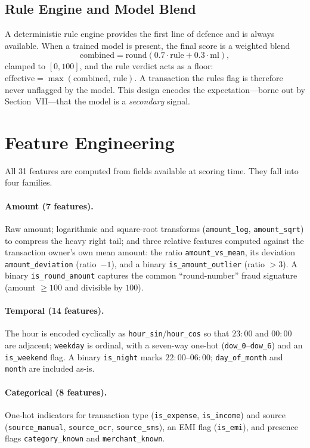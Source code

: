 \documentclass[conference]{IEEEtran}
\begin{document}
\subsection{Rule Engine and Model Blend}
A deterministic rule engine provides the first line of defence and is always
available. When a trained model is present, the final score is a weighted
blend
\begin{equation}
\text{combined} = \mathrm{round}\!\left(0.7\cdot \text{rule} +
0.3\cdot \text{ml}\right),
\end{equation}
clamped to $[0,100]$, and the rule verdict acts as a floor:
$\text{effective} = \max(\text{combined},\,\text{rule})$. A transaction the
rules flag is therefore never unflagged by the model. This design encodes the
expectation---borne out by Section~VII---that the model is a \emph{secondary}
signal.

\section{Feature Engineering}
All 31 features are computed from fields available at scoring time. They fall
into four families.

\paragraph{Amount (7 features).}
Raw amount; logarithmic and square-root transforms
(\texttt{amount\_log}, \texttt{amount\_sqrt}) to compress the heavy right
tail; and three relative features computed against the transaction owner's own
mean amount: the ratio \texttt{amount\_vs\_mean}, its deviation
\texttt{amount\_deviation} (ratio~$-1$), and a binary
\texttt{is\_amount\_outlier} (ratio $>3$). A binary
\texttt{is\_round\_amount} captures the common ``round-number'' fraud
signature (amount $\ge 100$ and divisible by $100$).

\paragraph{Temporal (14 features).}
The hour is encoded cyclically as \texttt{hour\_sin}/\texttt{hour\_cos} so
that $23{:}00$ and $00{:}00$ are adjacent; \texttt{weekday} is ordinal, with a
seven-way one-hot (\texttt{dow\_0}--\texttt{dow\_6}) and an
\texttt{is\_weekend} flag. A binary \texttt{is\_night} marks
$22{:}00$--$06{:}00$; \texttt{day\_of\_month} and \texttt{month} are included
as-is.

\paragraph{Categorical (8 features).}
One-hot indicators for transaction type
(\texttt{is\_expense}, \texttt{is\_income}) and source
(\texttt{source\_manual}, \texttt{source\_ocr}, \texttt{source\_sms}), an
EMI flag (\texttt{is\_emi}), and presence flags
\texttt{category\_known} and \texttt{merchant\_known}.
\end{document}
